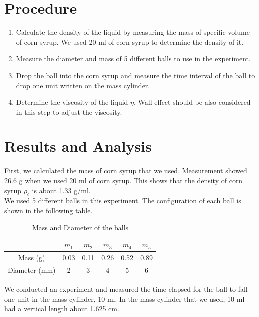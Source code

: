 \documentclass[a4paper]{article}
\begin{document}
\section{Procedure}
\begin{enumerate}
\item{Calculate the density of the liquid by measuring the mass of specific volume of corn syrup. We used 20 ml of corn syrup to determine the density of it.}
\item{Measure the diameter and mass of 5 different balls to use in the experiment.}
\item{Drop the ball into the corn syrup and measure the time interval of the ball to drop one unit written on the mass cylinder.}
\item{Determine the viscosity of the liquid $\eta$. Wall effect should be also considered in this step to adjust the viscosity.}
\end{enumerate}

\section{Results and Analysis}
First, we calculated the mass of corn syrup that we used. Measurement showed 26.6 g when we used 20 ml of corn syrup. This shows that the density of corn syrup $\rho_c$ is about 1.33 g/ml. \\ \newline
We used 5 different balls in this experiment. The configuration of each ball is shown in the following table.

\begin{table}[htbp]
\begin{center}
\begin{tabular}{|c|c|c|c|c|c|}
\hline
 & $m_1$ & $m_2$ & $m_3$ & $m_4$ & $m_5$ \\ \hline 
Mass (g) & 0.03 & 0.11 & 0.26 & 0.52 & 0.89 \\ \hline
Diameter (mm) & 2 & 3 & 4 & 5 & 6\\ \hline
\end{tabular}
\caption{Mass and Diameter of the balls}
\end{center}
\end{table}
We conducted an experiment and measured the time elapsed for the ball to fall one unit in the mass cylinder, 10 ml. In the mass cylinder that we used, 10 ml had a vertical length about 1.625 cm.
\end{document}
